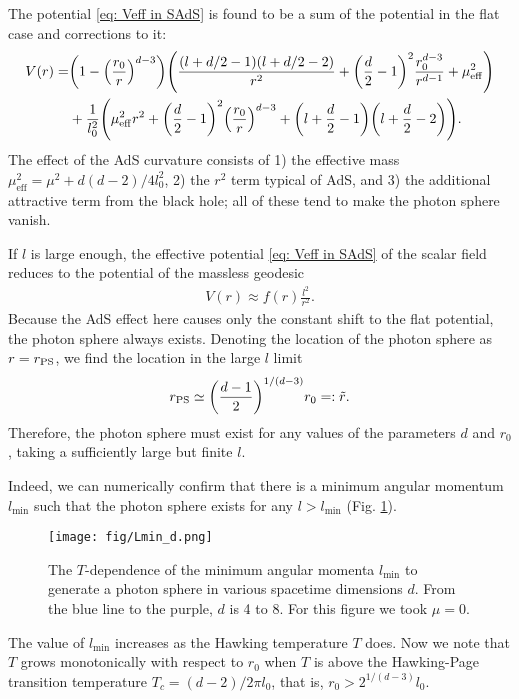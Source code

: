 \documentclass[a4paper,11pt]{article}
\begin{document}
The potential \eqref{eq: Veff in SAdS} is found to be a sum of the potential in the flat case and corrections to it:
\begin{align}
    \begin{aligned}
    V(r)=&\qty(1-\qty(\frac{r_0}{r})^{d-3})\qty(\frac{(l+d/2-1)(l+d/2-2)}{r^2}+\qty(\frac{d}{2}-1)^2\frac{r_0^{d-3}}{r^{d-1}}+\mu^2_\mathrm{eff})\\
    &+\frac{1}{l^2_0}\qty(\mu^2_\mathrm{eff}r^2+\qty(\frac{d}{2}-1)^2\qty(\frac{r_0}{r})^{d-3}+\qty(l+\frac{d}{2}-1)\qty(l+\frac{d}{2}-2)).
    \end{aligned}
\end{align}
The effect of the AdS curvature consists of 1) the effective mass $\mu^2_\mathrm{eff}=\mu^2+d(d-2)/4l_0^2$, 2) the $r^2$ term typical of AdS, and 3) the additional attractive term from the black hole; all of these tend to make the photon sphere vanish.

If $l$ is large enough, the effective potential \eqref{eq: Veff in SAdS} of the scalar field reduces to the potential of the massless geodesic
\begin{align}
    V(r)\approx f(r)\frac{l^2}{r^2}.
    \label{geodesicV}
\end{align}
Because the AdS effect here causes only the constant shift to the flat potential, the photon sphere always exists. Denoting the location of the photon sphere as $r=r_{\rm PS}$, we find the location in the large $l$ limit  
\begin{align}
    r_{\rm PS} \simeq \qty(\frac{d-1}{2})^{1/(d-3)}r_0=:\tilde{r}.
    \label{geops}
\end{align}
Therefore, the photon sphere must exist for any values of the parameters $d$ and $r_0$, taking a sufficiently large but finite $l$.

Indeed, we can numerically confirm that there is a minimum angular momentum $l_\mathrm{min}$ such that the photon sphere exists for any $l>l_\mathrm{min}$ (Fig. \ref{fig: lmin in ds}).
\begin{figure}[t]
    \centering
    \texttt{[image: fig/Lmin\_d.png]}
    \caption{The $T$-dependence of the minimum angular momenta $l_\mathrm{min}$ to generate a photon sphere in various spacetime dimensions $d$. From the blue line to the purple, $d$ is 4 to 8. For this figure we took $\mu=0$.}
    \label{fig: lmin in ds}
\end{figure}
The value of $l_\mathrm{min}$ increases as the Hawking temperature $T$ does. Now we note that $T$ grows monotonically with respect to $r_0$ when $T$ is above the Hawking-Page transition temperature $T_c=(d-2)/2\pi l_0$, that is, $r_0>2^{1/(d-3)}l_0$.
\end{document}
